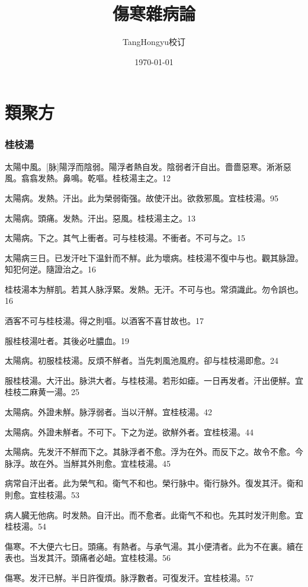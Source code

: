 \documentclass[12pt,twoside,UTF8,b5paper]{ctexbook}
\title{傷寒雜病論}
\author{TangHongyu校订}
\date{\today}
\begin{document}
\maketitle
\tableofcontents%

\part{類聚方}

\section{桂枝湯}

太陽中風。[脉]陽浮而陰弱。陽浮者熱自发。陰弱者汗自出。嗇嗇惡寒。淅淅惡風。翕翕发熱。鼻鳴。乾嘔。桂枝湯主之。12

太陽病。发熱。汗出。此为榮弱衛强。故使汗出。欲救邪風。宜桂枝湯。95

太陽病。頭痛。发熱。汗出。惡風。桂枝湯主之。13

太陽病。下之。其气上衝者。可与桂枝湯。不衝者。不可与之。15

太陽病三日。已发汗吐下温針而不觧。此为壞病。桂枝湯不復中与也。觀其脉證。知犯何逆。隨證治之。16

桂枝湯本为觧肌。若其人脉浮緊。发熱。无汗。不可与也。常須識此。勿令誤也。16

酒客不可与桂枝湯。得之則嘔。以酒客不喜甘故也。17

服桂枝湯吐者。其後必吐膿血。19

太陽病。初服桂枝湯。反煩不觧者。当先刺風池風府。卻与桂枝湯即愈。24

服桂枝湯。大汗出。脉洪大者。与桂枝湯。若形如瘧。一日再发者。汗出便觧。宜桂枝二麻黄一湯。25

太陽病。外證未觧。脉浮弱者。当以汗觧。宜桂枝湯。42

太陽病。外證未觧者。不可下。下之为逆。欲觧外者。宜桂枝湯。44

太陽病。先发汗不觧而下之。其脉浮者不愈。浮为在外。而反下之。故令不愈。今脉浮。故在外。当觧其外則愈。宜桂枝湯。45

病常自汗出者。此为榮气和。衛气不和也。榮行脉中。衛行脉外。復发其汗。衛和則愈。宜桂枝湯。53

病人臓无他病。时发熱。自汗出。而不愈者。此衛气不和也。先其时发汗則愈。宜桂枝湯。54

傷寒。不大便六七日。頭痛。有熱者。与承气湯。其小便清者。此为不在裏。續在表也。当发其汗。頭痛者必衄。宜桂枝湯。56

傷寒。发汗已觧。半日許復煩。脉浮數者。可復发汗。宜桂枝湯。57
\end{document}
